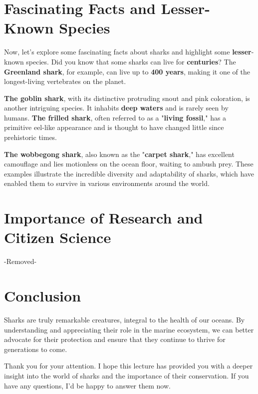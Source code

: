 \section{Fascinating Facts and Lesser-Known Species}
Now, let's explore some fascinating facts about sharks and highlight some \textbf{lesser}-known species. Did you know that some sharks can live for \textbf{centuries}? The \textbf{Greenland shark}, for example, can live up to \textbf{400 years}, making it one of the longest-living vertebrates on the planet.

\textbf{The goblin shark}, with its distinctive protruding snout and pink coloration, is another intriguing species. It inhabits \textbf{deep waters} and is rarely seen by humans. \textbf{The frilled shark}, often referred to as a "\textbf{living fossil}," has a primitive eel-like appearance and is thought to have changed little since prehistoric times.

\textbf{The wobbegong shark}, also known as the "\textbf{carpet shark}," has excellent camouflage and lies motionless on the ocean floor, waiting to ambush prey. These examples illustrate the incredible diversity and adaptability of sharks, which have enabled them to survive in various environments around the world.

\section{Importance of Research and Citizen Science} -Removed-


\section{Conclusion}
Sharks are truly remarkable creatures, integral to the health of our oceans. By understanding and appreciating their role in the marine ecosystem, we can better advocate for their protection and ensure that they continue to thrive for generations to come.

Thank you for your attention. I hope this lecture has provided you with a deeper insight into the world of sharks and the importance of their conservation. If you have any questions, I'd be happy to answer them now.